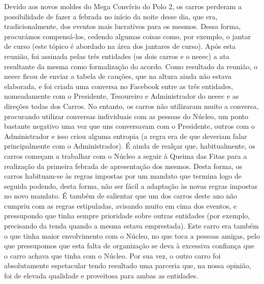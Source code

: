 Devido aos novos moldes do Mega Convívio do Polo 2, os carros perderam a possibilidade de fazer a febrada no início da noite desse dia, que era, tradicionalmente, dos eventos mais lucrativos para os mesmos. Dessa forma, procurámos compensá-los, cedendo algumas coisas como, por exemplo, o jantar de curso (este tópico é abordado na área dos jantares de curso). Após esta reunião, foi assinada pelas três entidades (os dois carros e o \acrshort{neeec}) a ata resultante da mesma como formalização do acordo. Como resultado da reunião, o \acrshort{neeec} ficou de enviar a tabela de cauções, que na altura ainda não estava elaborada, e foi criada uma conversa no Facebook entre as três entidades, nomeadamente com o Presidente, Tesoureiro e Administrador do \acrshort{neeec} e as direções todas dos Carros. No entanto, os carros não utilizaram muito a conversa, procurando utilizar conversas individuais com as pessoas do Núcleo, um ponto bastante negativo uma vez que uns conversavam com o Presidente, outros com o Administrador e isso criou alguma entropia (a regra era de que deveriam falar principalmente com o Administrador). É ainda de realçar que, habitualmente, os carros começam a trabalhar com o Núcleo a seguir à Queima das Fitas para a realização da primeira febrada de apresentação dos mesmos. Desta forma, os carros habituam-se às regras impostas por um mandato que termina logo de seguida podendo, desta forma, não ser fácil a adaptação às novas regras impostas no novo mandato. É também de salientar que um dos carros deste ano não cumpriu com as regras estipuladas, avisando muito em cima dos eventos, e pressupondo que tinha sempre prioridade sobre outras entidades (por exemplo, precisando da tenda quando a mesma estava emprestada). Este carro era também o que tinha maior envolvimento com o Núcleo, no que toca a pessoas amigas, pelo que pressupomos que esta falta de organização se deva à excessiva confiança que o carro achava que tinha com o Núcleo. Por sua vez, o outro carro foi absolutamente espetacular tendo resultado uma parceria que, na nossa opinião, foi de elevada qualidade e proveitosa para ambas as entidades.